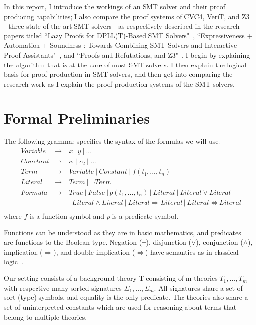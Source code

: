 \documentclass{article}
\begin{document}
In this report, I introduce the workings of an SMT solver 
and their proof producing capabilities; I also compare the 
proof systems of CVC4, VeriT, and Z3 - three 
state-of-the-art SMT solvers - as respectively 
described in the research papers titled ``Lazy Proofs for 
DPLL(T)-Based SMT Solvers"~\cite{DBLP:conf/fmcad/KatzBTRH16}, 
``Expressiveness + Automation + Soundness : 
Towards Combining SMT Solvers and Interactive 
Proof Assistants"~\cite{DBLP:conf/tacas/FontaineMMNT06}, 
and ``Proofs and Refutations, and Z3"~\cite{DBLP:conf/lpar/MouraB08}.
I begin by explaining the algorithm that is at the core 
of most SMT solvers. I then explain the logical basis for 
proof production in SMT solvers, and then get into 
comparing the research work as I explain the proof 
production systems of the SMT solvers.


\section{Formal Preliminaries}
\label{sec:prelim}
The following grammar specifies the syntax of the formulas we
will use: 
\begin{align*}
&Variable &\rightarrow\  &x\ |\ y\ |\ ...  \\
&Constant &\rightarrow\ &c_1\ |\ c_2\ |\ ...  \\
&Term &\rightarrow\ &Variable\ |\ Constant\ |\ f(t_1, ..., t_n) \\
&Literal &\rightarrow\ &Term\ |\ \neg Term \\
&Formula &\rightarrow\ &True\ |\ False\ |\ p(t_1, ..., t_n)\ 
					|\ Literal\ |\ Literal \lor Literal \\ 
& & &				|\ Literal \land Literal\ 
					|\ Literal \Rightarrow Literal\ 
					|\ Literal \iff Literal \\
\end{align*}
where $f$ is a function symbol and $p$ is a predicate symbol.

Functions can be understood as they are in basic mathematics, 
and predicates are functions to the Boolean type. Negation 
($\neg$), disjunction ($\lor$), conjunction ($\land$), 
implication ($\Rightarrow$), and double implication
($\iff$) have semantics as in classical logic~\cite{prop}.

Our setting consists of a background theory T consisting 
of m theories $T_1, ..., T_m$ with respective many-sorted 
signatures $\Sigma_1, ..., \Sigma_m$. All signatures share 
a set of sort (type) symbols, and equality is the only 
predicate. The theories also share a set of 
uninterpreted constants which are used for reasoning about 
terms that belong to multiple theories. 
\end{document}

